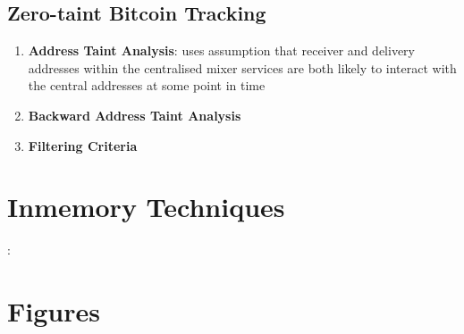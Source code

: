 \documentclass{article}
\begin{document}
\subsection{Zero-taint Bitcoin Tracking}

\begin{enumerate}
\item \textbf{Address Taint Analysis}: uses assumption that receiver and delivery addresses within the centralised mixer services are both likely to interact with the central addresses at some point in time
\item \textbf{Backward Address Taint Analysis}
\item \textbf{Filtering Criteria}
\end{enumerate}

\section{Inmemory Techniques}

: \cite{Vanderhorst:2017}

\section{Figures}


\printbibliography
\end{document}
